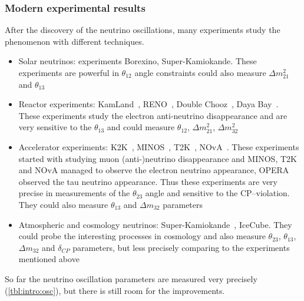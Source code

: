 \documentclass[../main.tex]{subfiles}
\begin{document}
\subsubsection{Modern experimental results}
After the discovery of the neutrino oscillations, many experiments study the phenomenon with different techniques.
\begin{itemize}
  \item Solar neutrinos: experiments Borexino, Super-Kamiokande. These experiments are powerful in $\theta_{12}$ angle constraints could also measure $\Delta m_{21}^2$ and $\theta_{13}$
  \item Reactor experiments: KamLand~\cite{Eguchi2003}, RENO~\cite{Ahn2012}, Double Chooz~\cite{Abe2014}, Daya Bay~\cite{An2014}. These experiments study the electron anti-neutrino disappearance and are very sensitive to the $\theta_{13}$ and could measure $\theta_{12}$, $\Delta m_{21}^2$, $\Delta m_{32}^2$
  \item Accelerator experiments: K2K~\cite{Ahn2006}, MINOS~\cite{Adamson2014}, T2K~\cite{Abe2020a}, NOvA~\cite{Acero2019}. These experiments started with studying muon (anti-)neutrino disappearance and MINOS, T2K and NOvA managed to observe the electron neutrino appearance, OPERA observed the tau neutrino appearance. Thus these experiments are very precise in measurements of the $\theta_{23}$ angle and sensitive to the CP--violation. They could also measure $\theta_{13}$ and $\Delta m_{32}$ parameters
  \item Atmospheric and cosmology neutrinos: Super-Kamiokande~\cite{Jiang2019}, IceCube. They could probe the interesting processes in cosmology and also measure $\theta_{23}$, $\theta_{13}$, $\Delta m_{32}$ and $\delta_{CP}$ parameters, but less precisely comparing to the experiments mentioned above
\end{itemize}

So far the neutrino oscillation parameters are measured very precisely (\autoref{tbl:intro:osc}), but there is still room for the improvements.
\end{document}
